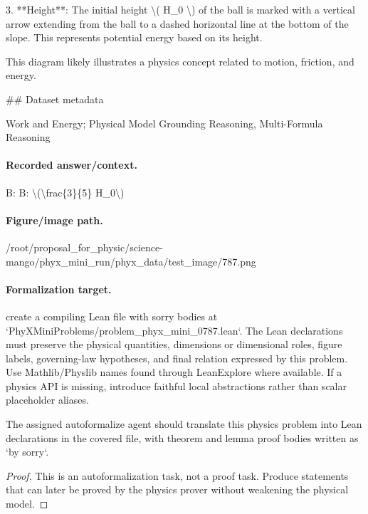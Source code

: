 3. **Height**: The initial height \textbackslash{}( H\_0 \textbackslash{}) of the ball is marked with a vertical arrow extending from the ball to a dashed horizontal line at the bottom of the slope. This represents potential energy based on its height.

This diagram likely illustrates a physics concept related to motion, friction, and energy.

\#\# Dataset metadata

Work and Energy; Physical Model Grounding Reasoning, Multi-Formula Reasoning

\paragraph{Recorded answer/context.}
B: B: \textbackslash{}(\textbackslash{}frac\{3\}\{5\} H\_0\textbackslash{})

\paragraph{Figure/image path.}
/root/proposal\_for\_physic/science-mango/phyx\_mini\_run/phyx\_data/test\_image/787.png

\paragraph{Formalization target.}
create a compiling Lean file with sorry bodies at `PhyXMiniProblems/problem\_phyx\_mini\_0787.lean`. The Lean declarations must preserve the physical quantities, dimensions or dimensional roles, figure labels, governing-law hypotheses, and final relation expressed by this problem.
Use Mathlib/Physlib names found through LeanExplore where available. If a physics API is missing, introduce faithful local abstractions rather than scalar placeholder aliases.

\begin{theorem}
\label{thm:physics:phyx_mini_0787:target}
The assigned autoformalize agent should translate this physics problem into Lean declarations in the covered file, with theorem and lemma proof bodies written as `by sorry`.
\end{theorem}
\begin{proof}
This is an autoformalization task, not a proof task. Produce statements that can later be proved by the physics prover without weakening the physical model.
\end{proof}

